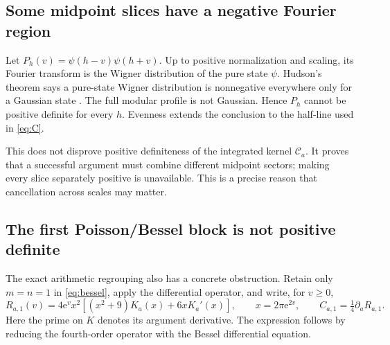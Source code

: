 \documentclass[11pt,letterpaper]{article}
\numberwithin{equation}{section}
\theoremstyle{remark}\newtheorem{remark}[proposition]{Remark}
\newcommand{\calC}{\mathcal C}
\newcommand{\ee}{\mathrm e}
\begin{document}
\subsection{Some midpoint slices have a negative Fourier region}
Let $P_h(v)=\psi(h-v)\psi(h+v)$. Up to positive normalization and scaling, its Fourier transform is the Wigner distribution of the pure state $\psi$. Hudson's theorem says a pure-state Wigner distribution is nonnegative everywhere only for a Gaussian state \cite{hudson}. The full modular profile is not Gaussian. Hence $P_h$ cannot be positive definite for every $h$. Evenness extends the conclusion to the half-line used in \eqref{eq:C}.

This does not disprove positive definiteness of the integrated kernel $\calC_a$. It proves that a successful argument must combine different midpoint sectors; making every slice separately positive is unavailable. This is a precise reason that cancellation across scales may matter.

\subsection{The first Poisson/Bessel block is not positive definite}
The exact arithmetic regrouping also has a concrete obstruction. Retain only
$m=n=1$ in \eqref{eq:bessel}, apply the differential operator, and write, for $v\ge0$,
\[
 R_{a,1}(v)=4\ee^v x^2[(x^2+9)K_a(x)+6xK_a'(x)],
 \qquad x=2\pi\ee^{2v},
 \qquad C_{a,1}=\tfrac14\partial_aR_{a,1}.
\]
Here the prime on $K$ denotes its argument derivative. The expression follows by reducing the fourth-order operator with the Bessel differential equation.
\end{document}
